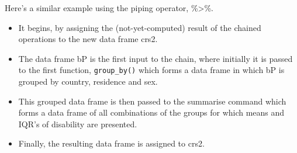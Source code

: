\documentclass[titlepage]{book}\usepackage{knitr}
\begin{document}

\begin{knitrout}
\color{fgcolor}\begin{kframe}
\begin{alltt}
 \hlkwb{<-} 
 \hlkwb{<-}   \hlstd{=}  \hlstd{=}
\end{alltt}
\end{kframe}
\end{knitrout}

Here's a similar example using the piping operator, \%>\%.
\begin{itemize}

\item{It begins, by assigning the (not-yet-computed) result of the chained operations to the new data frame crs2.}

\item{The data frame bP is the first input to the chain, where initially it is passed to the first function, \texttt{group\_by()} which forms a data frame in which bP is grouped by country, residence and sex.}

\item{This grouped data frame is then passed to the summarise command which forms a data frame of all combinations of the groups for which means and IQR's of disability are presented.}

\item{Finally, the resulting data frame is assigned to crs2.}
\end{itemize}

\begin{knitrout}
\color{fgcolor}
\end{knitrout}
\end{document}
